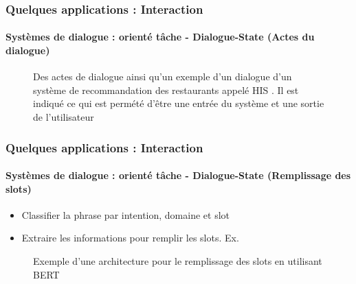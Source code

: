 \documentclass[xcolor=table]{beamer}
\begin{document}
\begin{frame}
	\frametitle{Quelques applications : Interaction}
	\framesubtitle{Systèmes de dialogue : orienté tâche - Dialogue-State (Actes du dialogue)}
	
	\vspace{-6pt}
	\begin{figure}
		\centering
		
		\vspace{-6pt}
		\caption{Des actes de dialogue ainsi qu'un exemple d'un dialogue d'un système de recommandation des restaurants appelé HIS \cite{2010-young-al}. Il est indiqué ce qui est permété d'être une entrée du système et une sortie de l'utilisateur \cite{2020-jurafsky-martin}}
	\end{figure}
	
\end{frame}

\begin{frame}
	\frametitle{Quelques applications : Interaction}
	\framesubtitle{Systèmes de dialogue : orienté tâche - Dialogue-State (Remplissage des slots)}
	
	\begin{itemize}
		\item Classifier la phrase par intention, domaine et slot
		\item Extraire les informations pour remplir les slots. Ex. 
	\end{itemize}
	
	\begin{figure}
		\centering
		\caption{Exemple d'une architecture pour le remplissage des slots en utilisant BERT \cite{2020-jurafsky-martin}}
	\end{figure}
	
\end{frame}
\end{document}
